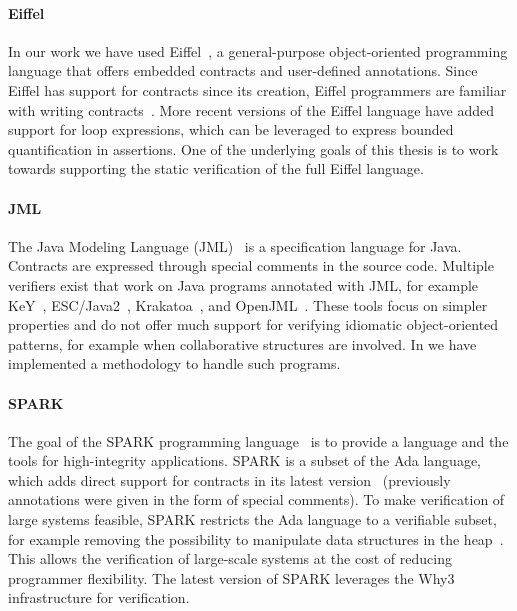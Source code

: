 \paragraph{Eiffel}

In our work we have used Eiffel~\cite{MEYER97}, a general-purpose object-oriented programming language that offers embedded contracts and user-defined annotations.
Since Eiffel has support for contracts since its creation, Eiffel programmers are familiar with writing contracts~\cite{ESTLER14}.
More recent versions of the Eiffel language have added support for loop expressions, which can be leveraged to express bounded quantification in assertions.
One of the underlying goals of this thesis is to work towards supporting the static verification of the full Eiffel language.

\paragraph{JML}

The Java Modeling Language (JML)~\cite{LEAVENS05} is a specification language for Java.
Contracts are expressed through special comments in the source code.
Multiple verifiers exist that work on Java programs annotated with JML, for example KeY~\cite{BECKERT07}, ESC/Java2~\cite{COK05,CHALIN06}, Krakatoa~\cite{FILLIATRE07}, and OpenJML~\cite{COK11}.
These tools focus on simpler properties and do not offer much support for verifying idiomatic object-oriented patterns, for example when collaborative structures are involved.
In \AutoProof we have implemented a methodology to handle such programs.

\paragraph{SPARK}

The goal of the SPARK programming language~\cite{BARNES03} is to provide a language and the tools for high-integrity applications.
SPARK is a subset of the Ada language, which adds direct support for contracts in its latest version~\cite{ADA2012} (previously annotations were given in the form of special comments).
To make verification of large systems feasible, SPARK restricts the Ada language to a verifiable subset, for example removing the possibility to manipulate data structures in the heap~\cite{BRITO10}.
This allows the verification of large-scale systems at the cost of reducing programmer flexibility.
The latest version of SPARK leverages the Why3~\cite{FILLIATRE13} infrastructure for verification.

